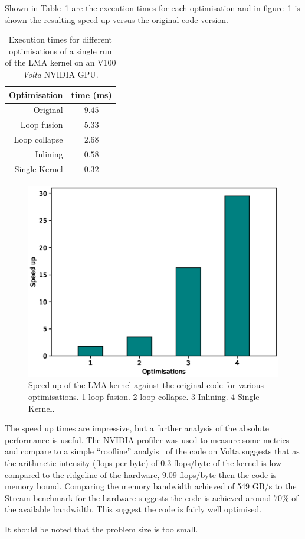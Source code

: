 Shown in Table~\ref{tab:lma_nvidia} are the execution times for each
optimisation and in figure~\ref{fig:lma_nvidia} is shown the resulting
speed up versus the original code version.

\begin{table}
\centering
\caption{\label{tab:lma_nvidia} Execution times for different
  optimisations of a single run of  the LMA kernel on an V100 
  {\em Volta} NVIDIA GPU.}
\begin{tabular}{rc}
Optimisation & time (ms) \\\hline
Original     & $9.45$ \\
Loop fusion  & $5.33$ \\
Loop collapse & $2.68$ \\ 
Inlining      & $0.58$ \\
Single Kernel & $0.32$ \\\hline
\end{tabular}
\end{table}

\begin{figure}
\centering\includegraphics[width=1.0\linewidth]{figs/LMA-nvidia.eps}
\caption{\label{fig:lma_nvidia}Speed up of the LMA kernel against the
  original code for various optimisations. 1 loop fusion. 2 loop
  collapse. 3 Inlining. 4 Single Kernel.}
\end{figure} 

The speed up times are impressive, but a further analysis of the
absolute performance is useful. The NVIDIA profiler was
used to measure some metrics and compare to a simple ``roofline''
analyis~\cite{roofline} of the code on Volta suggests that as the arithmetic
intensity (flops per byte) of $0.3$ flops/byte of the kernel is low
compared to the ridgeline of the hardware, $9.09$ flops/byte then the
code is memory bound. Comparing the memory bandwidth achieved of 549
GB/s to the Stream benchmark for the hardware suggests the code is
achieved around $70\%$ of the available bandwidth. This suggest the
code is fairly well optimised.

It should be noted that the problem size is too small. 

